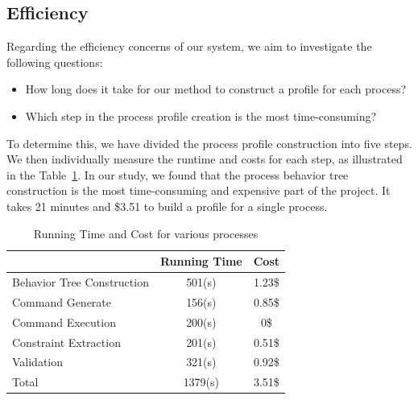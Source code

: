 \subsection{Efficiency}
\label{sec-eff}
Regarding the efficiency concerns of our system, we aim to investigate the following questions:
\begin{itemize}
    \item How long does it take for our method to construct a profile for each process?
    \item Which step in the process profile creation is the most time-consuming?
\end{itemize}

To determine this, we have divided the process profile construction into five steps. We then individually measure the runtime and costs for each step, as illustrated in the Table~\ref{tab:process_metrics}.
In our study, we found that the process behavior tree construction is the most time-consuming and expensive part of the project. It takes 21 minutes and \$3.51 to build a profile for a single process.

\begin{table}[h!]
    \centering
    \begin{tabular}{|l|c|c|}
        \hline
        & Running Time & Cost \\
        \hline
        Behavior Tree Construction & 501(s) & 1.23\$ \\
        \hline
        Command Generate & 156(s) & 0.85\$ \\
        \hline
        Command Execution & 200(s) & 0\$ \\
        \hline
        Constraint Extraction & 201(s) & 0.51\$ \\
        \hline
        Validation & 321(s) & 0.92\$ \\
        \hline
        Total & 1379(s) & 3.51\$ \\
        \hline
    \end{tabular}
    \caption{Running Time and Cost for various processes}
    \label{tab:process_metrics}
\end{table}

